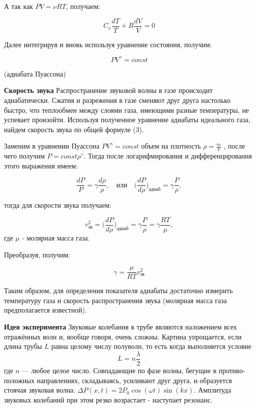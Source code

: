 \documentclass[10pt]{article}
\begin{document}
    А так как $PV = \nu RT$, получаем: 

    \begin{equation}
        C_v \frac{dT}{T} + R \frac{dV}{V} = 0
    \end{equation}

    Далее интегрируя и вновь используя уравнение состояния, получим:

    \begin{equation}
        PV^{\gamma} = const
    \end{equation}

    (адиабата Пуассона)

    \textbf{Скорость звука}
    Распространение звуковой волны в газе происходит адиабатически. Сжатия и разрежения в газе сменяют друг друга настолько быстро, что теплообмен между слоями газа, имеющими разные температуры, не успевает произойти. Используя полученное уравнение адиабаты идеального газа, найдем скорость звука по общей формуле (3).

    Заменим в уравнении Пуассона $PV^{\gamma} = const$ объем на плотность $\rho = \frac{m}{V}$ , после чего получим $P = const \rho^{\gamma} $. Тогда после логарифмирования и дифференцирования этого выражения имеем:

    \begin{equation}
        \frac{dP}{P} = \gamma \frac {d\rho}{\rho}, \quad \text{или} \quad \bigg(\frac{dP}{d\rho}\bigg)_\text{адиаб} = \gamma \frac{P}{\rho},
    \end{equation}

    тогда для скорости звука получаем:

    \begin{equation}
        v_\text{зв}^2 = \bigg(\frac{dP}{d\rho}\bigg)_\text{адиаб} = \gamma \frac{P}{\rho} = \gamma \frac{RT}{\mu},
    \end{equation}
    где $\mu$ - молярная масса газа.

    Преобразуя, получим:

    \begin{equation}
        \gamma = \frac{\mu}{RT}v_\text{зв}^2
    \end{equation}

    Таким образом, для определения показателя адиабаты достаточно измерить температуру газа и скорость распространения звука (молярная масса газа предполагается известной).

    \textbf{Идея эксперимента}
    Звуковые колебания в трубе являются наложением всех отражённых волн и, вообще говоря, очень сложны. Картина упрощается, если длина трубы $L$ равна целому числу полуволн, то есть когда выполняется условие
    \begin{equation}
        L = n\frac{\lambda}{2}
    \end{equation}
    где $n$ — любое целое число. Совпадающие по фазе волны, бегущие в противо- положных направлениях, складываясь, усиливают друг друга, и образуется стоячая звуковая волна:
    $\Delta P(x,t) = 2P_0 \cos (\omega t) \sin (kx)$.
    Амплитуда звуковых колебаний при этом резко возрастает - наступает резонанс.
\end{document}

